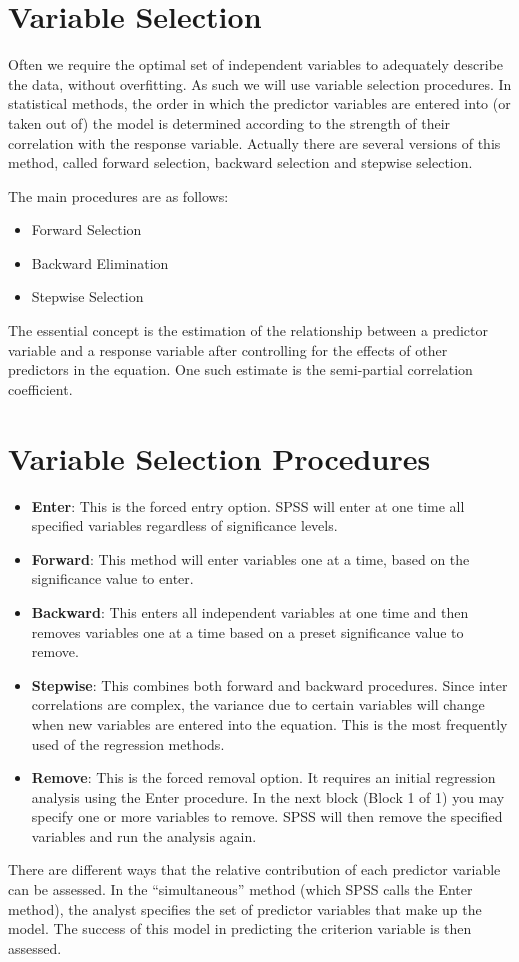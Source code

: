 

\section{Variable Selection}
Often we require the optimal set of independent variables to adequately describe the data, without overfitting. As such we will use variable selection procedures. In statistical methods, the order in which the predictor variables are entered into (or taken out of) the model is determined according to the strength of their correlation with the response variable. Actually there are several versions of this method, called forward selection, backward selection and stepwise selection.

The main procedures are as follows:
\begin{itemize}
	\item Forward Selection
	\item Backward Elimination
	\item Stepwise Selection
\end{itemize}

The essential concept is the estimation of the relationship between a predictor
variable and a response variable after controlling for the effects of other
predictors in the equation. One such estimate is the semi-partial correlation coefficient.


\section{Variable Selection Procedures}

\begin{itemize}
\item \textbf{Enter}: This is the forced entry option. SPSS will enter at one time all specified variables regardless of significance levels.
\item \textbf{Forward}: This method will enter variables one at a time, based on the significance value to enter.
\item \textbf{Backward}: This enters all independent variables at one time and then removes variables one at a time based on a preset significance value to remove.
\item \textbf{Stepwise}: This combines both forward and backward procedures. Since inter correlations are complex, the variance due to certain variables will change when new variables are entered into the equation. This is the most frequently used of the regression methods.
\item \textbf{Remove}: This is the forced removal option. It requires an initial regression analysis using the Enter procedure. In the next block (Block 1 of 1) you may specify one or more variables to remove. SPSS will then remove the specified variables and run the analysis again.
\end{itemize}
There are different ways that the relative contribution of each predictor variable can be assessed. In the “simultaneous” method (which SPSS calls the Enter method), the analyst specifies the set of predictor variables that make up the model. The success of this model in predicting the criterion variable is then assessed.

